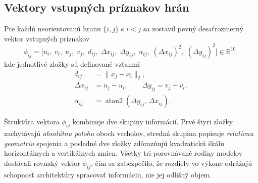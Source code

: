 \subsection{Vektory vstupných príznakov hrán}
\label{sec:hranove_priznaky}

\indent Pre každú neorientovanú hranu \(\{i,j\}\) s \(i < j\) sa zostavil
pevný desaťrozmerný vektor vstupných príznakov
\begin{equation}
\phi_{ij} =
\bigl[
  u_i,\;
  v_i,\;
  u_j,\;
  v_j,\;
  d_{ij},\;
  \Delta x_{ij},\;
  \Delta y_{ij},\;
  \alpha_{ij},\;
  (\Delta x_{ij})^2,\;
  (\Delta y_{ij})^2
\bigr]
\in \mathbb{R}^{10},
\label{eq:edge_features}
\end{equation}
kde jednotlivé zložky sú definované vzťahmi
\begin{align}
d_{ij} &= \lVert x_j - x_i \rVert_2,
\label{eq:feat_dist}\\
\Delta x_{ij} &= u_j - u_i, \qquad \Delta y_{ij} = v_j - v_i,
\label{eq:feat_delta}\\
\alpha_{ij} &= \operatorname{atan2}(\Delta y_{ij},\, \Delta x_{ij}).
\label{eq:feat_angle}
\end{align}

\begin{symboltable}
    \symbolitem{\(\alpha_{ij}\)}{označuje orientovaný uhol spojnice \((i,j)\) vzhľadom na os \(x\), hodnoty v \((-\pi, \pi]\).}
\end{symboltable}

\indent Štruktúra vektora \(\phi_{ij}\) kombinuje dve skupiny informácií.
Prvé štyri zložky zachytávajú \emph{absolútnu polohu} oboch vrcholov,
stredná skupina popisuje \emph{relatívnu geometriu} spojenia a posledné
dve zložky zdôrazňujú kvadratickú škálu horizontálnych a vertikálnych
zmien. Všetky tri porovnávané rodiny modelov dostávali rovnaký vektor
\(\phi_{ij}\), čím sa zabezpečilo, že rozdiely vo výkone odrážajú
schopnosť architektúry spracovať informáciu, nie jej odlišný objem.

